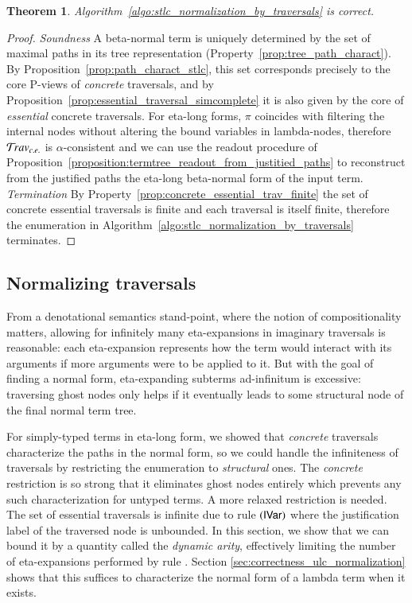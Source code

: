 \documentclass{elsarticle}
\theoremstyle{plain}
\newtheorem{theorem}{Theorem}[section]
\theoremstyle{definition}
\newcommand{\travsetcones}{\travset_{c.e.}} %
\def\coresymbol{\pi} %
\begin{document}
\begin{theorem}
Algorithm~\ref{algo:stlc_normalization_by_traversals} is correct.
\end{theorem}
\begin{proof}
\emph{Soundness} A beta-normal term is uniquely determined by the set of maximal paths in its tree representation (Property~\ref{prop:tree_path_charact}).
By Proposition~\ref{prop:path_charact_stlc}, this set corresponds precisely to the core P-views of \emph{concrete} traversals,
and by Proposition~\ref{prop:essential_traversal_simcomplete} it is also given by the core of \emph{essential} concrete traversals.
For eta-long forms, $\coresymbol$ coincides with filtering the internal nodes without altering the bound variables in lambda-nodes, therefore $\travsetcones$ is $\alpha$-consistent and we can use the
readout procedure of Proposition~\ref{proposition:termtree_readout_from_justitied_paths} to reconstruct
from the justified paths the
eta-long beta-normal form of the input term.
%
\emph{Termination} By Property~\ref{prop:concrete_essential_trav_finite} the set of concrete essential traversals is finite and each traversal is itself finite, therefore the enumeration in Algorithm~\ref{algo:stlc_normalization_by_traversals} terminates.
\end{proof}

\subsection{Normalizing traversals}

From a denotational semantics stand-point,
where the notion of compositionality matters,
allowing for infinitely many eta-expansions
in imaginary traversals is reasonable:
each eta-expansion represents how the term would interact with its arguments if more arguments were to be applied to it.
But with the goal of finding a normal form, eta-expanding subterms ad-infinitum is excessive: traversing ghost nodes only helps if it eventually leads to some structural node of the final normal term tree.

For simply-typed terms in eta-long form,
we showed that \emph{concrete} traversals
characterize the paths in the normal form,
so we could handle the infiniteness of traversals
by restricting the enumeration to \emph{structural} ones.
The \emph{concrete} restriction
is so strong that it eliminates ghost nodes entirely which prevents any such characterization for untyped terms. A more relaxed restriction is needed.
The set of essential traversals is infinite due to rule $\mathbf{({\sf IVar})}$ where the justification label of the traversed node is unbounded. In this section, we show that we can bound it by a quantity called the \emph{dynamic arity}, effectively limiting the number of eta-expansions
 performed by rule . Section \ref{sec:correctness_ulc_normalization} shows that this suffices to characterize the normal form of a lambda term when it exists.
\end{document}
